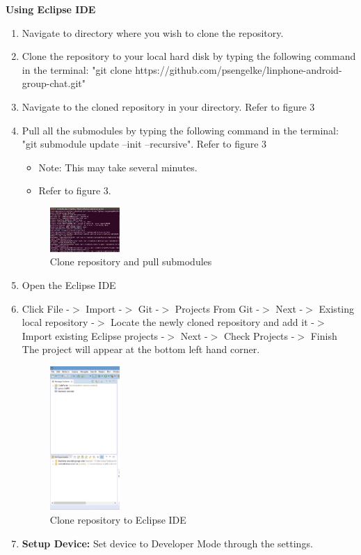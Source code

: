 \documentclass[11pt]{article}
\begin{document}
\textbf{Using Eclipse IDE}
\begin{enumerate}
\item Navigate to directory where you wish to clone the repository. 
\item Clone the repository to your local hard disk by typing the following command in the terminal: "git clone https://github.com/psengelke/linphone-android-group-chat.git" 
\item Navigate to the cloned repository in your directory. Refer to figure 3
\item Pull all the submodules by typing the following command in the terminal: "git submodule update --init --recursive". Refer to figure 3
\begin{itemize}
\item Note: This may take several minutes. 
\item Refer to figure 3.
\end{itemize}
\begin{figure}[H]
\includegraphics[width=100px]{./images/clone.png}
\caption{Clone repository and pull submodules}
\label{repoClone}
\end{figure}
\item Open the Eclipse IDE
\item Click File -$>$ Import -$>$ Git -$>$ Projects From Git -$>$ Next -$>$ Existing local repository -$>$ Locate the newly cloned repository and add it -$>$ Import existing Eclipse projects -$>$ Next -$>$ Check Projects -$>$ Finish
\subitem The project will appear at the bottom left hand corner.
\begin{figure}[H]
\includegraphics[width=100px]{./images/git.png}
\caption{Clone repository to Eclipse IDE}
\label{repoClone}
\end{figure}
\item \textbf{Setup Device: } Set device to Developer Mode through the settings. 

\end{enumerate}
\end{document}
